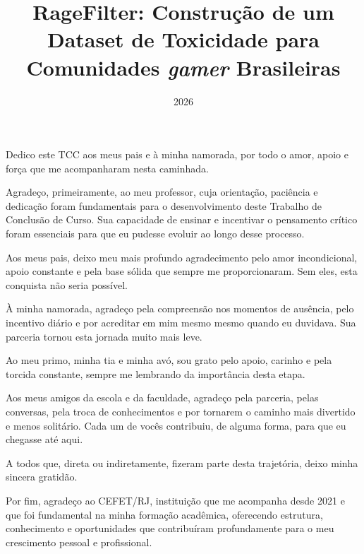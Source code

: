 \documentclass{eic-bcc-tcc}
\title{RageFilter: Construção de um Dataset de Toxicidade para Comunidades \textit{gamer} Brasileiras}
\date{2026}
\begin{document}
\maketitle

\begin{dedicatoria}
Dedico este TCC aos meus pais e à minha namorada, por todo o amor, apoio e força que me acompanharam nesta caminhada.
\end{dedicatoria}


\begin{agradecimentos}
Agradeço, primeiramente, ao meu professor, cuja orientação, paciência e dedicação foram fundamentais para o desenvolvimento deste Trabalho de Conclusão de Curso. Sua capacidade de ensinar e incentivar o pensamento crítico foram essenciais para que eu pudesse evoluir ao longo desse processo.

Aos meus pais, deixo meu mais profundo agradecimento pelo amor incondicional, apoio constante e pela base sólida que sempre me proporcionaram. Sem eles, esta conquista não seria possível.

À minha namorada, agradeço pela compreensão nos momentos de ausência, pelo incentivo diário e por acreditar em mim mesmo mesmo quando eu duvidava. Sua parceria tornou esta jornada muito mais leve.

Ao meu primo, minha tia e minha avó, sou grato pelo apoio, carinho e pela torcida constante, sempre me lembrando da importância desta etapa.

Aos meus amigos da escola e da faculdade, agradeço pela parceria, pelas conversas, pela troca de conhecimentos e por tornarem o caminho mais divertido e menos solitário. Cada um de vocês contribuiu, de alguma forma, para que eu chegasse até aqui.

A todos que, direta ou indiretamente, fizeram parte desta trajetória, deixo minha sincera gratidão.

Por fim, agradeço ao CEFET/RJ, instituição que me acompanha desde 2021 e que foi fundamental na minha formação acadêmica, oferecendo estrutura, conhecimento e oportunidades que contribuíram profundamente para o meu crescimento pessoal e profissional.
\end{agradecimentos}
\end{document}
